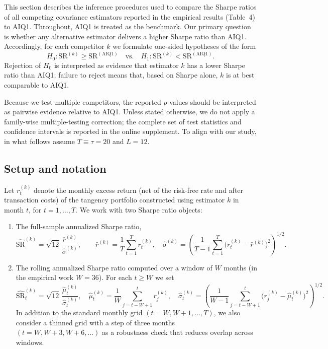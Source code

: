 \documentclass[12pt,letterpaper]{article}
\begin{document}
This section describes the inference procedures used to compare the Sharpe ratios of all competing covariance estimators reported in the empirical results (Table~4) to AIQ1. Throughout, AIQ1 is treated as the benchmark. Our primary question is whether any alternative estimator delivers a higher Sharpe ratio than AIQ1. Accordingly, for each competitor \(k\) we formulate one-sided hypotheses of the form
\[
H_{0}: \text{SR}^{(k)} \ge \text{SR}^{(\text{AIQ1})}
\quad\text{vs.}\quad
H_{1}: \text{SR}^{(k)} < \text{SR}^{(\text{AIQ1})}.
\]
Rejection of \(H_{0}\) is interpreted as evidence that estimator \(k\) has a lower Sharpe ratio than AIQ1; failure to reject means that, based on Sharpe alone, \(k\) is at best comparable to AIQ1.

Because we test multiple competitors, the reported \(p\)-values should be interpreted as pairwise evidence relative to AIQ1. Unless stated otherwise, we do not apply a family-wise multiple-testing correction; the complete set of test statistics and confidence intervals is reported in the online supplement. To align with our study, in what follows assume \(T\equiv\tau=20\) and \(L=12\).


\subsection*{Setup and notation}

Let \(r_{t}^{(k)}\) denote the monthly excess return (net of the risk-free rate and after transaction costs) of the tangency portfolio constructed using estimator \(k\) in month \(t\), for \(t = 1,\dots,T\). We work with two Sharpe ratio objects:

\begin{enumerate}
\item The full-sample annualized Sharpe ratio,
\[
\widehat{\text{SR}}^{(k)} 
= \sqrt{12}\,\frac{\bar{r}^{(k)}}{\hat{\sigma}^{(k)}},
\qquad
\bar{r}^{(k)} = \frac{1}{T}\sum_{t=1}^{T} r_{t}^{(k)},\quad
\hat{\sigma}^{(k)} = \left(\frac{1}{T-1}\sum_{t=1}^{T} \bigl(r_{t}^{(k)} - \bar{r}^{(k)}\bigr)^{2}\right)^{1/2}.
\]

\item The rolling annualized Sharpe ratio computed over a window of \(W\) months (in the empirical work \(W=36\)). For each \(t \ge W\) we set
\[
\widehat{\text{SR}}_{t}^{(k)} 
= \sqrt{12}\,\frac{\hat{\mu}_{t}^{(k)}}{\hat{\sigma}_{t}^{(k)}},
\quad
\hat{\mu}_{t}^{(k)} = \frac{1}{W}\sum_{j=t-W+1}^{t} r_{j}^{(k)},\quad
\hat{\sigma}_{t}^{(k)} = \left(\frac{1}{W-1}\sum_{j=t-W+1}^{t} \bigl(r_{j}^{(k)} - \hat{\mu}_{t}^{(k)}\bigr)^{2}\right)^{1/2}.
\]
In addition to the standard monthly grid \((t = W,W+1,\dots,T)\), we also consider a thinned grid with a step of three months \((t = W,W+3,W+6,\dots)\) as a robustness check that reduces overlap across windows.
\end{enumerate}
\end{document}
